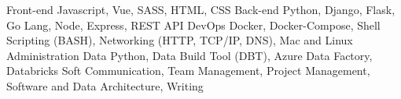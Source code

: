 
\begin{cvskills}
	\cvskill%
		{Front-end}
		{Javascript, Vue, SASS, HTML, CSS}
	\cvskill%
		{Back-end}
		{Python, Django, Flask, Go Lang, Node, Express, REST API}
	\cvskill%
		{DevOps}
		{Docker, Docker-Compose, Shell Scripting (BASH), Networking (HTTP, TCP/IP, DNS), Mac and Linux Administration}
	\cvskill%
		{Data}
		{Python, Data Build Tool (DBT), Azure Data Factory, Databricks}
	\cvskill%
		{Soft}
		{Communication, Team Management, Project Management, Software and Data Architecture, Writing}
\end{cvskills}
